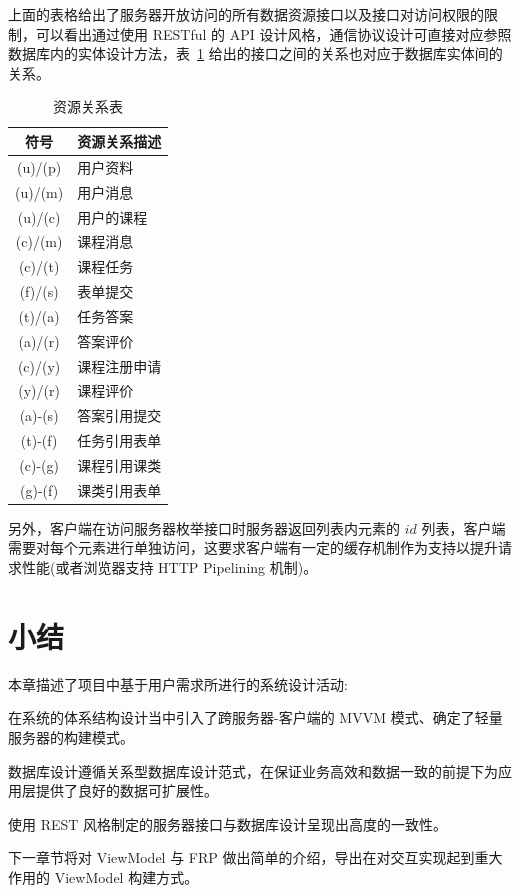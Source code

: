 
上面的表格给出了服务器开放访问的所有数据资源接口以及接口对访问权限的限制，可以看出通过使用 RESTful 的 API 设计风格，通信协议设计可直接对应参照数据库内的实体设计方法，表~\ref{APURIRelation} 给出的接口之间的关系也对应于数据库实体间的关系。

\begin{table}[!h]
  \begin{center}
    \noindent
    \ttfamily
    \begin{tabular}{|c|l|}
      \hline
      \textbf{符号} & \textbf{资源关系描述} \\ \hline
      (u)/(p) & 用户资料     \\ \hline
      (u)/(m) & 用户消息     \\ \hline
      (u)/(c) & 用户的课程   \\ \hline
      (c)/(m) & 课程消息     \\ \hline
      (c)/(t) & 课程任务     \\ \hline
      (f)/(s) & 表单提交     \\ \hline
      (t)/(a) & 任务答案     \\ \hline
      (a)/(r) & 答案评价     \\ \hline
      (c)/(y) & 课程注册申请 \\ \hline
      (y)/(r) & 课程评价     \\ \hline
      (a)-(s) & 答案引用提交 \\ \hline
      (t)-(f) & 任务引用表单 \\ \hline
      (c)-(g) & 课程引用课类 \\ \hline
      (g)-(f) & 课类引用表单 \\ \hline
    \end{tabular}
    \caption{资源关系表\label{APURIRelation}}
  \end{center}
\end{table}

另外，客户端在访问服务器枚举接口时服务器返回列表内元素的 $id$ 列表，客户端需要对每个元素进行单独访问，这要求客户端有一定的缓存机制作为支持以提升请求性能(或者浏览器支持 HTTP Pipelining 机制)。

\newpage

\section{小结}

本章描述了项目中基于用户需求所进行的系统设计活动:

在系统的体系结构设计当中引入了跨服务器-客户端的 MVVM 模式、确定了轻量服务器的构建模式。

数据库设计遵循关系型数据库设计范式，在保证业务高效和数据一致的前提下为应用层提供了良好的数据可扩展性。

使用 REST 风格制定的服务器接口与数据库设计呈现出高度的一致性。

下一章节将对 ViewModel 与 FRP 做出简单的介绍，导出在对交互实现起到重大作用的 ViewModel 构建方式。

